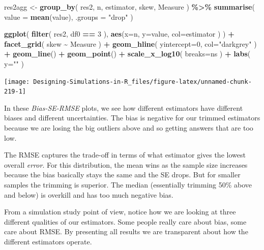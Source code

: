 \documentclass[
]{book}
\newenvironment{Shaded}{\begin{snugshade}}{\end{snugshade}}
\newcommand{\AttributeTok}[1]{\textcolor[rgb]{0.13,0.29,0.53}{#1}}
\newcommand{\DecValTok}[1]{\textcolor[rgb]{0.00,0.00,0.81}{#1}}
\newcommand{\FunctionTok}[1]{\textcolor[rgb]{0.13,0.29,0.53}{\textbf{#1}}}
\newcommand{\NormalTok}[1]{#1}
\newcommand{\OtherTok}[1]{\textcolor[rgb]{0.56,0.35,0.01}{#1}}
\newcommand{\SpecialCharTok}[1]{\textcolor[rgb]{0.81,0.36,0.00}{\textbf{#1}}}
\newcommand{\StringTok}[1]{\textcolor[rgb]{0.31,0.60,0.02}{#1}}
\begin{document}
\begin{Shaded}
\begin{Highlighting}[]
\NormalTok{res2agg }\OtherTok{\textless{}{-}} \FunctionTok{group\_by}\NormalTok{( res2, n, estimator, skew, Measure ) }\SpecialCharTok{\%\textgreater{}\%}
  \FunctionTok{summarise}\NormalTok{( }\AttributeTok{value =} \FunctionTok{mean}\NormalTok{(value), }\AttributeTok{.groups =} \StringTok{"drop"}\NormalTok{ )}

\FunctionTok{ggplot}\NormalTok{( }\FunctionTok{filter}\NormalTok{( res2, df0 }\SpecialCharTok{==} \DecValTok{3}\NormalTok{ ), }\FunctionTok{aes}\NormalTok{(}\AttributeTok{x=}\NormalTok{n, }\AttributeTok{y=}\NormalTok{value, }\AttributeTok{col=}\NormalTok{estimator ) ) }\SpecialCharTok{+}
    \FunctionTok{facet\_grid}\NormalTok{( skew }\SpecialCharTok{\textasciitilde{}}\NormalTok{ Measure ) }\SpecialCharTok{+}
    \FunctionTok{geom\_hline}\NormalTok{( }\AttributeTok{yintercept=}\DecValTok{0}\NormalTok{, }\AttributeTok{col=}\StringTok{"darkgrey"}\NormalTok{ ) }\SpecialCharTok{+}
    \FunctionTok{geom\_line}\NormalTok{() }\SpecialCharTok{+} \FunctionTok{geom\_point}\NormalTok{() }\SpecialCharTok{+}
    \FunctionTok{scale\_x\_log10}\NormalTok{( }\AttributeTok{breaks=}\NormalTok{ns ) }\SpecialCharTok{+}
    \FunctionTok{labs}\NormalTok{( }\AttributeTok{y=}\StringTok{""}\NormalTok{ )}
\end{Highlighting}
\end{Shaded}

\begin{center}\texttt{[image: Designing-Simulations-in-R\_files/figure-latex/unnamed-chunk-219-1]} \end{center}

In these \emph{Bias-SE-RMSE} plots, we see how different estimators have different biases and different
uncertainties.
The bias is negative for our trimmed estimators because we
are losing the big outliers above and so getting answers that are too low.

The RMSE captures the trade-off in terms of what estimator gives the lowest
overall \emph{error}. For this distribution, the mean wins as the sample size
increases because the bias basically stays the same and the SE drops. But
for smaller samples the trimming is superior. The median (essentially
trimming 50\% above and below) is overkill and has too much negative bias.

From a simulation study point of view, notice how we are looking at three
different qualities of our estimators. Some people really care about bias,
some care about RMSE. By presenting all results we are transparent about how
the different estimators operate.
\end{document}
